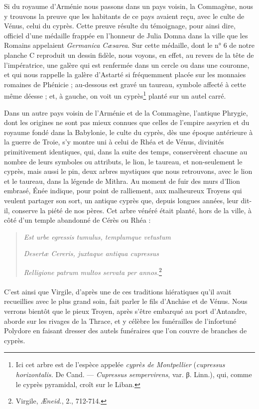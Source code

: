 \documentclass[a4paper, 11pt, oneside, polutonikogreek, french]{article}
\begin{document}
Si du royaume d'Arménie nous passons dans un pays voisin, la Commagène, nous y trouvons la preuve que les habitants de ce pays avaient reçu, avec le culte de Vénus, celui du cyprès. Cette preuve résulte du témoignage, pour ainsi dire, officiel d'une médaille frappée en l'honneur de Julia Domna dans la ville que les Romains appelaient \emph{Germanica Cæsarea}. Sur cette médaille, dont le n° 6 de notre planche C reproduit un dessin fidèle, nous voyons, en effet, au revers de la tête de l'impératrice, une galère qui est renfermée dans un cercle ou dans une couronne, et qui nous rappelle la galère d'Astarté si fréquemment placée sur les monnaies romaines de Phénicie ; au-dessous est gravé un taureau, symbole affecté à cette même déesse ; et, à gauche, on voit un cyprès\footnote{Ici cet arbre est de l'espèce appelée \emph{cyprès de Montpellier} (\emph{cupressus horizontalis.} De Cand. --- \emph{Cupressus sempervirens}, var. β. Linn.), qui, comme le cyprès pyramidal, croît sur le Liban.} planté sur un autel carré.

Dans un autre pays voisin de l'Arménie et de la Commagène, l'antique Phrygie, dont les origines ne sont pas mieux connues que celles de l'empire assyrien et du royaume fondé dans la Babylonie, le culte du cyprès, dès une époque antérieure à la guerre de Troie, s'y montre uni à celui de Rhéa et de Vénus, divinités primitivement identiques, qui, dans la suite des temps, conservèrent chacune au nombre de leurs symboles ou attributs, le lion, le taureau, et non-seulement le cyprès, mais aussi le pin, deux arbres mystiques que nous retrouvons, avec le lion et le taureau, dans la légende de Mithra. Au moment de fuir des murs d'Ilion embrasé, Énée indique, pour point de ralliement, aux malheureux Troyens qui veulent partager son sort, un antique cyprès que, depuis longues années, leur dit-il, conserve la piété de nos pères. Cet arbre vénéré était planté, hors de la ville, à côté d'un temple abandonné de Cérès ou Rhéa :

\begin{quotation}\footnotesize

\emph{Est urbe egressis tumulus, templumque vetustum}

\emph{Desertæ Cereris, juxtaque antiqua cupressus}

\emph{Relligione patrum multos servata per annos.}\footnote{Virgile, \emph{Æneid.}, 2., 712-714.}
\end{quotation}

\paragraph{}
C'est ainsi que Virgile, d'après une de ces traditions hiératiques qu'il avait recueillies avec le plus grand soin, fait parler le fils d'Anchise et de Vénus. Nous verrons bientôt que le pieux Troyen, après s'être embarqué au port d'Antandre, aborde sur les rivages de la Thrace, et y célèbre les funérailles de l'infortuné Polydore en faisant dresser des autels funéraires que l'on couvre de branches de cyprès.
\end{document}
